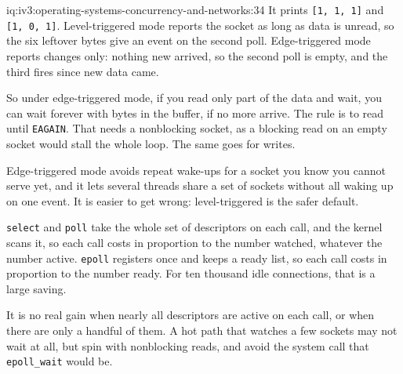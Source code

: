 \begin{solution}{iq:iv3:operating-systems-concurrency-and-networks:34}
It prints \texttt{[1, 1, 1]} and \texttt{[1, 0, 1]}. Level-triggered mode reports the socket as long as data is unread, so the six leftover bytes give an event on the second poll. Edge-triggered mode reports changes only: nothing new arrived, so the second poll is empty, and the third fires since new data came.

So under edge-triggered mode, if you read only part of the data and wait, you can wait forever with bytes in the buffer, if no more arrive. The rule is to read until \texttt{EAGAIN}. That needs a nonblocking socket, as a blocking read on an empty socket would stall the whole loop. The same goes for writes.

Edge-triggered mode avoids repeat wake-ups for a socket you know you cannot serve yet, and it lets several threads share a set of sockets without all waking up on one event. It is easier to get wrong: level-triggered is the safer default.

\texttt{select} and \texttt{poll} take the whole set of descriptors on each call, and the kernel scans it, so each call costs in proportion to the number watched, whatever the number active. \texttt{epoll} registers once and keeps a ready list, so each call costs in proportion to the number ready. For ten thousand idle connections, that is a large saving.

It is no real gain when nearly all descriptors are active on each call, or when there are only a handful of them. A hot path that watches a few sockets may not wait at all, but spin with nonblocking reads, and avoid the system call that \texttt{epoll\_wait} would be.

\end{solution}

